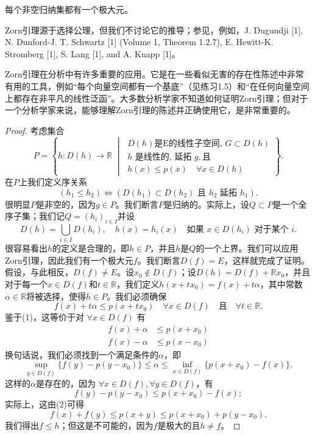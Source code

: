 \begin{lemma}[Zorn]\label{lemma1.1}
每个非空归纳集都有一个极大元。
\end{lemma}

Zorn引理源于选择公理，但我们不讨论它的推导；参见，例如，J. Dugundji [1], N. Dunford-J. T. Schwartz [1] (Volume 1, Theorem 1.2.7), E. Hewitt-K. Stromberg [1], S. Lang [1], and A. Knapp [1]。

\begin{remark}
Zorn引理在分析中有许多重要的应用。它是在一些看似无害的存在性陈述中非常有用的工具，例如“每个向量空间都有一个基底”（见练习1.5）和“在任何向量空间上都存在非平凡的线性泛函”。大多数分析学家不知道如何证明Zorn引理；但对于一个分析学家来说，能够理解Zorn引理的陈述并正确使用它，是非常重要的。
\end{remark}

\begin{proof}
考虑集合
\[ P = \left\{ h: D(h) \to \mathbb{R} \;\middle|\; \begin{array}{l} D(h) \text{是E的线性子空间, } G \subset D(h) \\ h \text{ 是线性的, 延拓 } g, \text{且} \\ h(x) \leq p(x) \quad \forall x \in D(h) \end{array} \right\}. \]
在$P$上我们定义序关系
\[ (h_1 \leq h_2) \Leftrightarrow (D(h_1) \subset D(h_2) \text{ 且 } h_2 \text{ 延拓 } h_1). \]
很明显$P$是非空的，因为$g \in P$。我们断言$P$是归纳的。实际上，设$Q \subset P$是一个全序子集；我们记$Q = (h_i)_{i \in I}$并设
\[ D(h) = \bigcup_{i \in I} D(h_i), \quad h(x) = h_i(x) \quad \text{如果 } x \in D(h_i) \text{ 对于某个 } i. \]
很容易看出$h$的定义是合理的，即$h \in P$，并且$h$是$Q$的一个上界。我们可以应用Zorn引理，因此我们有一个极大元$f$。我们断言$D(f) = E$，这样就完成了证明。
假设，与此相反，$D(f) \neq E$。设$x_0 \notin D(f)$；设$D(h) = D(f) + \mathbb{R}x_0$，并且对于每一个$x \in D(f)$和$t \in \mathbb{R}$，我们定义$h(x+tx_0) = f(x) + t\alpha$，其中常数$\alpha \in \mathbb{R}$将被选择，使得$h \in P$。我们必须确保
\[ f(x) + t\alpha \leq p(x+tx_0) \quad \forall x \in D(f) \quad \text{且} \quad \forall t \in \mathbb{R}. \]
鉴于(1)，这等价于对 $\forall x \in D(f)$ 有
\begin{align*}
f(x) + \alpha &\leq p(x+x_0) \\
f(x) - \alpha &\leq p(x-x_0)
\end{align*}
换句话说，我们必须找到一个满足条件的$\alpha$，即
\[ \sup_{y \in D(f)} \{f(y) - p(y-x_0)\} \leq \alpha \leq \inf_{x \in D(f)} \{p(x+x_0) - f(x)\}. \]
这样的$\alpha$是存在的，因为 $\forall x \in D(f), \forall y \in D(f)$，有
\[ f(y) - p(y-x_0) \leq p(x+x_0) - f(x); \]
实际上，这由(2)可得
\[ f(x)+f(y) \leq p(x+y) \leq p(x+x_0) + p(y-x_0). \]
我们得出$f \leq h$；但这是不可能的，因为$f$是极大的且$h \neq f$。
\end{proof}

